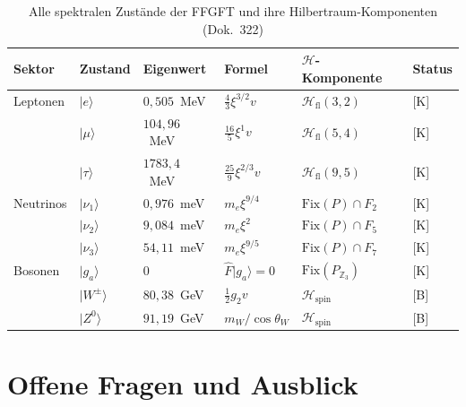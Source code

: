 \begin{table}[h!]
\centering
\caption{Alle spektralen Zustände der FFGFT und ihre
  Hilbertraum-Komponenten (Dok.~322)}
\label{tab:spektral}
\begin{tabular}{llllll}
\toprule
Sektor & Zustand & Eigenwert & Formel &
  $\mathcal{H}$-Komponente & Status \\
\midrule
Leptonen
  & $|e\rangle$      & $0{,}505$~MeV  & $\frac{4}{3}\xi^{3/2}v$
    & $\mathcal{H}_{\mathrm{fl}}(3,2)$       & [K] \\
  & $|\mu\rangle$    & $104{,}96$~MeV & $\frac{16}{5}\xi^1 v$
    & $\mathcal{H}_{\mathrm{fl}}(5,4)$       & [K] \\
  & $|\tau\rangle$   & $1783{,}4$~MeV & $\frac{25}{9}\xi^{2/3}v$
    & $\mathcal{H}_{\mathrm{fl}}(9,5)$       & [K] \\
\midrule
Neutrinos
  & $|\nu_1\rangle$  & $0{,}976$~meV  & $m_e\xi^{9/4}$
    & $\mathrm{Fix}(P)\cap F_2$              & [K] \\
  & $|\nu_2\rangle$  & $9{,}084$~meV  & $m_e\xi^2$
    & $\mathrm{Fix}(P)\cap F_5$              & [K] \\
  & $|\nu_3\rangle$  & $54{,}11$~meV  & $m_e\xi^{9/5}$
    & $\mathrm{Fix}(P)\cap F_7$              & [K] \\
\midrule
Bosonen
  & $|g_a\rangle$    & $0$            & $\hat{F}|g_a\rangle=0$
    & $\mathrm{Fix}(P_{\mathbb{Z}_3})$       & [K] \\
  & $|W^\pm\rangle$  & $80{,}38$~GeV  & $\frac{1}{2}g_2 v$
    & $\mathcal{H}_{\mathrm{spin}}$          & [B] \\
  & $|Z^0\rangle$    & $91{,}19$~GeV  & $m_W/\!\cos\theta_W$
    & $\mathcal{H}_{\mathrm{spin}}$          & [B] \\
\bottomrule
\end{tabular}
\end{table}

\section{Offene Fragen und Ausblick}

